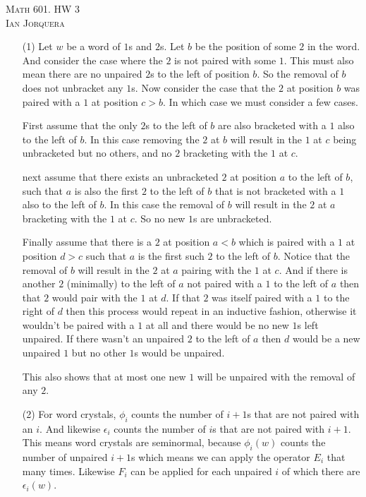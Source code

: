 \documentclass[12pt]{amsart}
\begin{document}
\begin{center}
    \textsc{Math 601. HW 3\\ Ian Jorquera}
\end{center}
\vspace{1em}
\begin{itemize} %
    \item[(1)] %
    Let $w$ be a word of $1$s and $2$s. Let $b$ be the position of some $2$ in the word. 
    And consider the case where the $2$ is not paired with some $1$. This must also mean there 
    are no unpaired $2$s to the left of position $b$. So the removal of $b$ does not unbracket any $1$s.
    Now consider the case that the $2$ at position $b$ was paired with a $1$ at position $c>b$. 
    In which case we must consider a few cases. 

    First assume that the only $2$s to the left of $b$ are also bracketed with a $1$ also to the left of $b$. 
    In this case removing the $2$ at $b$ will result in the $1$ at $c$ being unbracketed but no others, 
    and no $2$ bracketing with the $1$ at $c$.
    
    next assume that there exists an unbracketed $2$ at 
    position $a$ to the left of $b$, such that $a$ is also the first $2$ to the left of $b$ that is not bracketed
    with a $1$ also to the left of $b$. In this case the removal of $b$ will result in the $2$ at $a$ 
    bracketing with the $1$ at $c$. So no new $1$s are unbracketed.
    
    Finally assume that there is a $2$ at position $a<b$ 
    which is paired with a $1$ at position $d>c$ such that $a$ is the first such $2$ to the left of $b$.
    Notice that the removal of $b$ will result in the $2$ at $a$ pairing with the $1$ at $c$. And if 
    there is another $2$ (minimally) to the left of $a$ not paired with a $1$ to the left of $a$ then 
    that $2$ would pair with the $1$ at $d$. If that $2$ was itself paired with a $1$ to the right of $d$ 
    then this process would repeat in an inductive fashion, otherwise it wouldn't be paired with a 
    $1$ at all and there would be no new $1$s
    left unpaired. If there wasn't an unpaired $2$ to the left of $a$ then $d$ would be a new unpaired $1$ 
    but no other $1$s would be unpaired.

    This also shows that at most one new $1$ will be unpaired with the removal of any $2$.\\

    \item[(2)] %
    For word crystals, $\phi_i$ counts the number of 
    $i+1$s that are not paired with an $i$. And likewise $\epsilon_i$ counts
    the number of $i$s that are not paired with $i+1$.
    This means word crystals are seminormal, because $\phi_i(w)$ counts the number of 
    unpaired $i+1$s which means we can apply the operator $E_i$ that many times. Likewise 
    $F_i$ can be applied for each unpaired $i$ of which there are $\epsilon_i(w)$.\\


\end{itemize}
\end{document}
